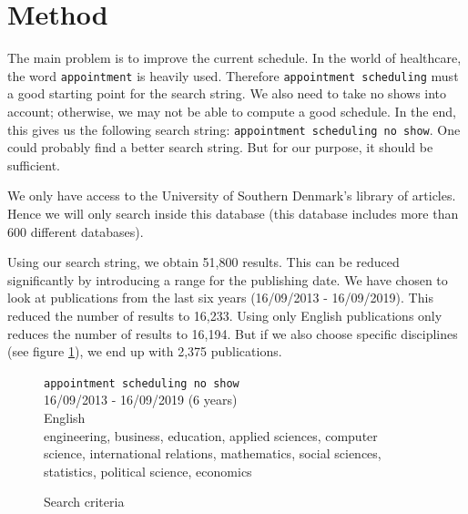 \documentclass[a4paper,12pt]{article}
\begin{document}
\bigbreak

\section*{Method}

The main problem is to improve the current schedule. In the world of healthcare, the word \texttt{appointment} is heavily used. Therefore \texttt{appointment scheduling} must a good starting point for the search string. We also need to take no shows into account; otherwise, we may not be able to compute a good schedule. In the end, this gives us the following search string: \texttt{appointment scheduling no show}. One could probably find a better search string. But for our purpose, it should be sufficient.

\bigbreak

We only have access to the University of Southern Denmark's library of articles. Hence we will only search inside this database (this database includes more than 600 different databases).

\bigbreak

Using our search string, we obtain 51,800 results. This can be reduced significantly by introducing a range for the publishing date. We have chosen to look at publications from the last six years (16/09/2013 - 16/09/2019). This reduced the number of results to 16,233. Using only English publications only reduces the number of results to 16,194. But if we also choose specific disciplines (see figure \ref{search-criteria}), we end up with 2,375 publications.

\bigbreak

\begin{figure}[H]
    \begin{framed}
         \texttt{appointment scheduling no show} \\
         16/09/2013 - 16/09/2019 (6 years) \\
         English \\
         engineering, business, education, applied sciences, computer \\ \makebox[3.7cm][l]{} science, international relations, mathematics, social sciences, \\ \makebox[3.7cm][l]{} statistics, political science, economics
    \end{framed}
    \caption{Search criteria}
    \label{search-criteria}
\end{figure}
\end{document}
